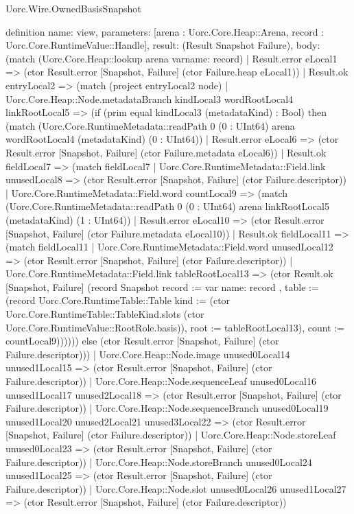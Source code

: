 \begin{lexlean}{Uorc.Wire.OwnedBasisSnapshot}
\begin{semanticmodule}
definition{
  name: view,
  parameters: [arena : Uorc.Core.Heap::Arena, record : Uorc.Core.RuntimeValue::Handle],
  result: (Result Snapshot Failure),
  body: (match (Uorc.Core.Heap::lookup arena var{name: record})
    | Result.error eLocal1 => (ctor Result.error [Snapshot, Failure] (ctor Failure.heap eLocal1))
    | Result.ok entryLocal2 => (match (project entryLocal2 node)
      | Uorc.Core.Heap::Node.metadataBranch kindLocal3 wordRootLocal4 linkRootLocal5 => (if (prim equal kindLocal3 (metadataKind) : Bool) then (match (Uorc.Core.RuntimeMetadata::readPath 0 (0 : UInt64) arena wordRootLocal4 (metadataKind) (0 : UInt64))
        | Result.error eLocal6 => (ctor Result.error [Snapshot, Failure] (ctor Failure.metadata eLocal6))
        | Result.ok fieldLocal7 => (match fieldLocal7
          | Uorc.Core.RuntimeMetadata::Field.link unusedLocal8 => (ctor Result.error [Snapshot, Failure] (ctor Failure.descriptor))
          | Uorc.Core.RuntimeMetadata::Field.word countLocal9 => (match (Uorc.Core.RuntimeMetadata::readPath 0 (0 : UInt64) arena linkRootLocal5 (metadataKind) (1 : UInt64))
            | Result.error eLocal10 => (ctor Result.error [Snapshot, Failure] (ctor Failure.metadata eLocal10))
            | Result.ok fieldLocal11 => (match fieldLocal11
              | Uorc.Core.RuntimeMetadata::Field.word unusedLocal12 => (ctor Result.error [Snapshot, Failure] (ctor Failure.descriptor))
              | Uorc.Core.RuntimeMetadata::Field.link tableRootLocal13 => (ctor Result.ok [Snapshot, Failure] (record Snapshot {record := var{
                name: record
              }, table := (record Uorc.Core.RuntimeTable::Table {kind := (ctor Uorc.Core.RuntimeTable::TableKind.slots (ctor Uorc.Core.RuntimeValue::RootRole.basis)), root := tableRootLocal13}), count := countLocal9})))))) else (ctor Result.error [Snapshot, Failure] (ctor Failure.descriptor)))
      | Uorc.Core.Heap::Node.image unused0Local14 unused1Local15 => (ctor Result.error [Snapshot, Failure] (ctor Failure.descriptor))
      | Uorc.Core.Heap::Node.sequenceLeaf unused0Local16 unused1Local17 unused2Local18 => (ctor Result.error [Snapshot, Failure] (ctor Failure.descriptor))
      | Uorc.Core.Heap::Node.sequenceBranch unused0Local19 unused1Local20 unused2Local21 unused3Local22 => (ctor Result.error [Snapshot, Failure] (ctor Failure.descriptor))
      | Uorc.Core.Heap::Node.storeLeaf unused0Local23 => (ctor Result.error [Snapshot, Failure] (ctor Failure.descriptor))
      | Uorc.Core.Heap::Node.storeBranch unused0Local24 unused1Local25 => (ctor Result.error [Snapshot, Failure] (ctor Failure.descriptor))
      | Uorc.Core.Heap::Node.slot unused0Local26 unused1Local27 => (ctor Result.error [Snapshot, Failure] (ctor Failure.descriptor))
}
\end{semanticmodule}
\end{lexlean}
